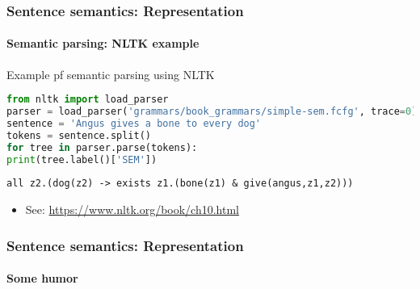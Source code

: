 \documentclass[xcolor=table]{beamer}
\begin{document}
\begin{frame}[fragile]
	\frametitle{Sentence semantics: Representation}
	\framesubtitle{Semantic parsing: NLTK example}
	
	\begin{exampleblock}{Example pf semantic parsing using NLTK}
		{\scriptsize
			\begin{lstlisting}[language=Python]
from nltk import load_parser
parser = load_parser('grammars/book_grammars/simple-sem.fcfg', trace=0)
sentence = 'Angus gives a bone to every dog'
tokens = sentence.split()
for tree in parser.parse(tokens):
print(tree.label()['SEM'])
			\end{lstlisting}
		}
		
		{\scriptsize\bfseries
			\begin{lstlisting}
all z2.(dog(z2) -> exists z1.(bone(z1) & give(angus,z1,z2)))
			\end{lstlisting}
		}
		
	\end{exampleblock}
	
	\begin{itemize}
		\item See: \url{https://www.nltk.org/book/ch10.html}
	\end{itemize}
	
\end{frame}

\begin{frame}
	\frametitle{Sentence semantics: Representation}
	\framesubtitle{Some humor}
	
	\begin{center}
	\end{center}
	
\end{frame}

\end{document}
